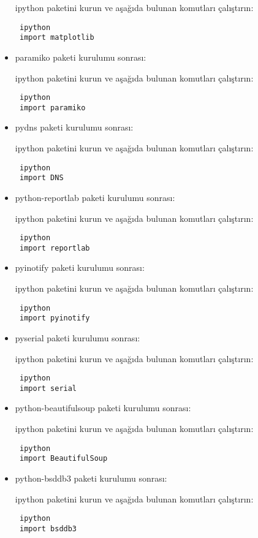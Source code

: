 \documentclass[a4paper,10pt]{article}
\begin{document}
\begin{itemize}
ipython paketini kurun ve aşağıda bulunan komutları çalıştırın:
\begin{verbatim}
 ipython
 import matplotlib
\end{verbatim}

\item paramiko paketi kurulumu sonrası:

ipython paketini kurun ve aşağıda bulunan komutları çalıştırın:
\begin{verbatim}
 ipython
 import paramiko
\end{verbatim}

\item pydns paketi kurulumu sonrası:

ipython paketini kurun ve aşağıda bulunan komutları çalıştırın:
\begin{verbatim}
 ipython
 import DNS
\end{verbatim}


\item python-reportlab paketi kurulumu sonrası:

ipython paketini kurun ve aşağıda bulunan komutları çalıştırın:
\begin{verbatim}
 ipython
 import reportlab
\end{verbatim}

\item pyinotify paketi kurulumu sonrası:

ipython paketini kurun ve aşağıda bulunan komutları çalıştırın:
\begin{verbatim}
 ipython
 import pyinotify
\end{verbatim}

\item pyserial  paketi kurulumu sonrası:

ipython paketini kurun ve aşağıda bulunan komutları çalıştırın:
\begin{verbatim}
 ipython
 import serial
\end{verbatim}

\item python-beautifulsoup  paketi kurulumu sonrası:

ipython paketini kurun ve aşağıda bulunan komutları çalıştırın:
\begin{verbatim}
 ipython
 import BeautifulSoup
\end{verbatim}

\item python-bsddb3  paketi kurulumu sonrası:

ipython paketini kurun ve aşağıda bulunan komutları çalıştırın:
\begin{verbatim}
 ipython
 import bsddb3
\end{verbatim}


\end{itemize}
\end{document}
